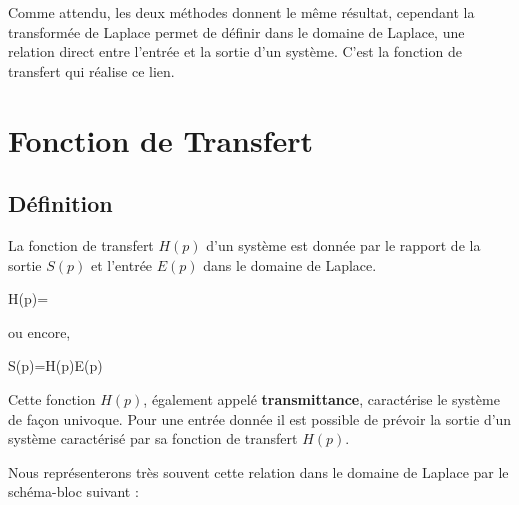 Comme attendu, les deux méthodes donnent le même résultat, cependant 
la transformée de Laplace permet de définir dans le domaine de Laplace, une 
relation direct entre l'entrée et la sortie d'un système. C'est la fonction 
de transfert qui réalise ce lien.

\section{Fonction de Transfert}

\subsection{Définition}

La fonction de transfert $H(p)$ d'un système est donnée par le rapport de la 
sortie $S(p)$ et l'entrée $E(p)$ dans le domaine de Laplace. 
\begin{bequation}
H(p)=
\end{bequation}
ou encore,
\begin{bequation}
    S(p)=H(p)E(p)\label{eq-she}
\end{bequation}

Cette fonction $H(p)$, également appelé \textbf{transmittance}, caractérise 
le système de façon univoque. Pour une entrée donnée il est possible de 
prévoir la sortie d'un système caractérisé par sa fonction de transfert $H(p)$.

Nous représenterons très souvent cette relation dans le domaine de Laplace 
par le schéma-bloc suivant : 
\begin{center}
    
\end{center}

